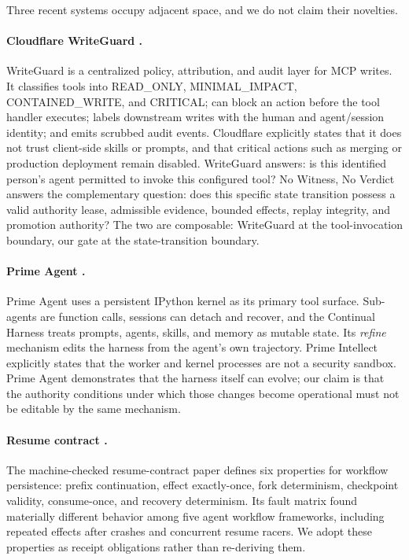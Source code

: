 Three recent systems occupy adjacent space, and we do not claim their
novelties.

\paragraph{Cloudflare WriteGuard \cite{writeguard}.} WriteGuard is a
centralized policy, attribution, and audit layer for MCP writes. It
classifies tools into READ\_ONLY, MINIMAL\_IMPACT, CONTAINED\_WRITE, and
CRITICAL; can block an action before the tool handler executes; labels
downstream writes with the human and agent/session identity; and emits
scrubbed audit events. Cloudflare explicitly states that it does not trust
client-side skills or prompts, and that critical actions such as merging or
production deployment remain disabled. WriteGuard answers: is this
identified person's agent permitted to invoke this configured tool?
No Witness, No Verdict answers the complementary question: does this
specific state transition possess a valid authority lease, admissible
evidence, bounded effects, replay integrity, and promotion authority?
The two are composable: WriteGuard at the tool-invocation boundary, our
gate at the state-transition boundary.

\paragraph{Prime Agent \cite{prime_agent}.} Prime Agent uses a persistent
IPython kernel as its primary tool surface. Sub-agents are function calls,
sessions can detach and recover, and the Continual Harness treats prompts,
agents, skills, and memory as mutable state. Its \emph{refine} mechanism
edits the harness from the agent's own trajectory. Prime Intellect
explicitly states that the worker and kernel processes are not a security
sandbox. Prime Agent demonstrates that the harness itself can evolve; our
claim is that the authority conditions under which those changes become
operational must not be editable by the same mechanism.

\paragraph{Resume contract \cite{resume_contract}.} The machine-checked
resume-contract paper defines six properties for workflow persistence:
prefix continuation, effect exactly-once, fork determinism, checkpoint
validity, consume-once, and recovery determinism. Its fault matrix found
materially different behavior among five agent workflow frameworks,
including repeated effects after crashes and concurrent resume racers.
We adopt these properties as receipt obligations rather than re-deriving
them.

